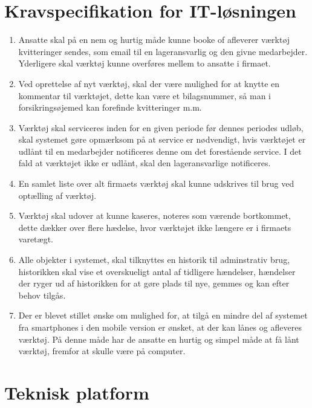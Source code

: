 \documentclass{article}
\begin{document}
\section{Kravspecifikation for IT-løsningen}
\begin{enumerate}
\item Ansatte skal på en nem og hurtig måde kunne booke of afleverer værktøj kvitteringer sendes, som email til en lageransvarlig og den givne medarbejder. Yderligere skal værktøj kunne overføres mellem to ansatte i firmaet. 

\item Ved oprettelse af nyt værktøj, skal der være mulighed for at knytte en kommentar til værktøjet, dette kan være et bilagsnummer, så man i forsikringsøjemed kan forefinde kvitteringer m.m.  

\item Værktøj skal serviceres inden for en given periode før dennes periodes udløb, skal systemet gøre opmærksom på at service er nødvendigt, hvis værktøjet er udlånt til en medarbejder notificeres denne om det forestående service. I det fald at værktøjet ikke er udlånt, skal den lageransvarlige notificeres. 

\item En samlet liste over alt firmaets værktøj skal kunne udskrives til brug ved optælling af værktøj. 

\item  Værktøj skal udover at kunne kaseres, noteres som værende bortkommet, dette dækker over flere hædelse, hvor værktøjet ikke længere er i firmaets varetægt. 

\item Alle objekter i systemet, skal tilknyttes en historik til adminstrativ brug, historikken skal vise et overskueligt antal af tidligere hændelser, hændelser der ryger ud af historikken for at gøre plads til nye, gemmes og kan efter behov tilgås. 

\item Der er blevet stillet ønske om mulighed for, at tilgå en mindre del af systemet fra smartphones i den mobile version er ønsket, at der kan lånes og afleveres værktøj. På denne måde har de ansatte en hurtig og simpel måde at få lånt værktøj, fremfor at skulle være på computer. 
\end{enumerate} 



\section{Teknisk platform}
\end{document}
